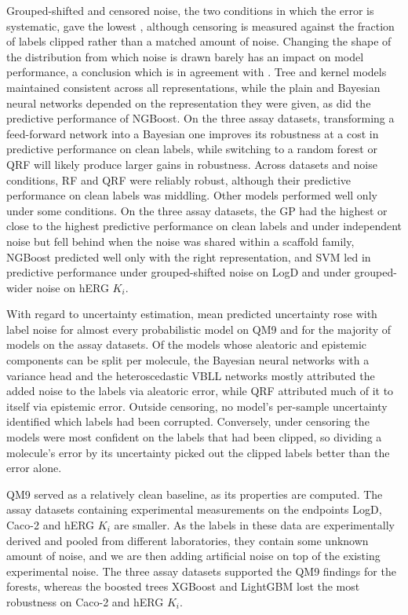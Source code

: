 Grouped-shifted and censored noise, the two conditions in which the error is systematic, gave the lowest \aucnorm{}, although censoring is measured against the fraction of labels clipped rather than a matched amount of noise. Changing the shape of the distribution from which noise is drawn barely has an impact on model performance, a conclusion which is in agreement with \citet{Heid2023}. Tree and kernel models maintained consistent \aucnorm{} across all representations, while the plain and Bayesian neural networks depended on the representation they were given, as did the predictive performance of NGBoost. On the three assay datasets, transforming a feed-forward network into a Bayesian one improves its robustness at a cost in predictive performance on clean labels, while switching to a random forest or QRF will likely produce larger gains in robustness. Across datasets and noise conditions, RF and QRF were reliably robust, although their predictive performance on clean labels was middling. Other models performed well only under some conditions. On the three assay datasets, the GP had the highest or close to the highest predictive performance on clean labels and under independent noise but fell behind when the noise was shared within a scaffold family, NGBoost predicted well only with the right representation, and SVM led in predictive performance under grouped-shifted noise on LogD and under grouped-wider noise on hERG $K_i$.

With regard to uncertainty estimation, mean predicted uncertainty rose with label noise for almost every probabilistic model on QM9 and for the majority of models on the assay datasets. Of the models whose aleatoric and epistemic components can be split per molecule, the Bayesian neural networks with a variance head and the heteroscedastic VBLL networks mostly attributed the added noise to the labels via aleatoric error, while QRF attributed much of it to itself via epistemic error. Outside censoring, no model's per-sample uncertainty identified which labels had been corrupted. Conversely, under censoring the models were most confident on the labels that had been clipped, so dividing a molecule's error by its uncertainty picked out the clipped labels better than the error alone.

QM9 served as a relatively clean baseline, as its properties are computed. The assay datasets containing experimental measurements on the endpoints LogD, Caco-2 \citep{openadmet} and hERG $K_i$ \citep{Zdrazil2023} are smaller. As the labels in these data are experimentally derived and pooled from different laboratories, they contain some unknown amount of noise, and we are then adding artificial noise on top of the existing experimental noise. The three assay datasets supported the QM9 findings for the forests, whereas the boosted trees XGBoost and LightGBM lost the most robustness on Caco-2 and hERG $K_i$.


